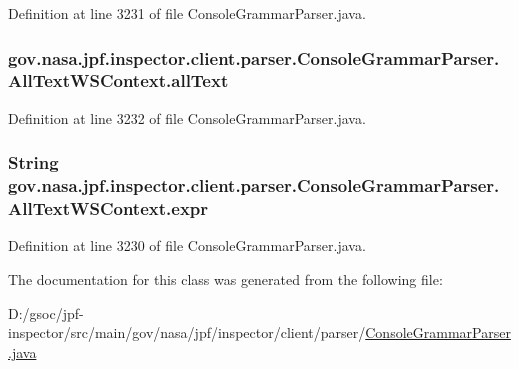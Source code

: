 Definition at line 3231 of file Console\+Grammar\+Parser.\+java.

\subsubsection[{\texorpdfstring{all\+Text}{allText}}]{ gov.\+nasa.\+jpf.\+inspector.\+client.\+parser.\+Console\+Grammar\+Parser.\+All\+Text\+W\+S\+Context.\+all\+Text}\hypertarget{classgov_1_1nasa_1_1jpf_1_1inspector_1_1client_1_1parser_1_1_console_grammar_parser_1_1_all_text_w_s_context_a65fe82f9d71a79370f40567e41ca18b9}{}\label{classgov_1_1nasa_1_1jpf_1_1inspector_1_1client_1_1parser_1_1_console_grammar_parser_1_1_all_text_w_s_context_a65fe82f9d71a79370f40567e41ca18b9}


Definition at line 3232 of file Console\+Grammar\+Parser.\+java.

\subsubsection[{\texorpdfstring{expr}{expr}}]{\setlength{\rightskip}{0pt plus 5cm}String gov.\+nasa.\+jpf.\+inspector.\+client.\+parser.\+Console\+Grammar\+Parser.\+All\+Text\+W\+S\+Context.\+expr}\hypertarget{classgov_1_1nasa_1_1jpf_1_1inspector_1_1client_1_1parser_1_1_console_grammar_parser_1_1_all_text_w_s_context_a5acf9404cc890dabadef183bbf4680a9}{}\label{classgov_1_1nasa_1_1jpf_1_1inspector_1_1client_1_1parser_1_1_console_grammar_parser_1_1_all_text_w_s_context_a5acf9404cc890dabadef183bbf4680a9}


Definition at line 3230 of file Console\+Grammar\+Parser.\+java.



The documentation for this class was generated from the following file\+:\begin{DoxyCompactItemize}
\item 
D\+:/gsoc/jpf-\/inspector/src/main/gov/nasa/jpf/inspector/client/parser/\hyperlink{_console_grammar_parser_8java}{Console\+Grammar\+Parser.\+java}\end{DoxyCompactItemize}
